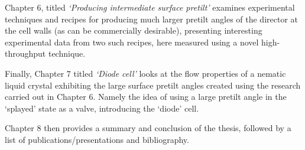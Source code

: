 Chapter 6, titled \textit{`Producing intermediate surface pretilt'} examines experimental techniques and recipes for producing much larger pretilt angles of the director at the cell walls (as can be commercially desirable), presenting interesting experimental data from two such recipes, here measured using a novel high-throughput technique.

Finally, Chapter 7 titled \textit{`Diode cell'} looks at the flow properties of a nematic liquid crystal exhibiting the large surface pretilt angles created using the research carried out in Chapter 6. Namely the idea of using a large pretilt angle in the `splayed' state as a valve, introducing the `diode' cell.
 
Chapter 8 then provides a summary and conclusion of the thesis, followed by a list of publications/presentations and bibliography.